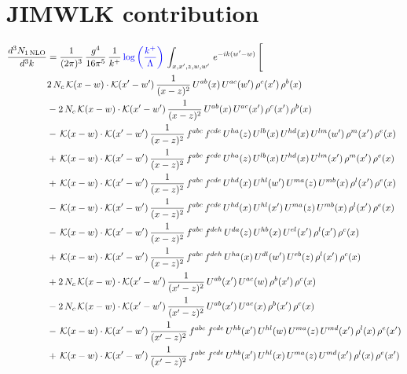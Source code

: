 \documentclass[9pt]{article}
\numberwithin{equation}{section}
\begin{document}
\section{JIMWLK contribution}
\begin{align}
\frac{d^{3}N_{1\,\mathrm{NLO}}}{d^{3}k} & = \frac{1}{(2\pi)^{3}}\,\frac{g^{4}}{16\pi^{5}}\,\frac{1}{k^{+}}\,{\color{blue}\log{\left(\frac{k^{+}}{\Lambda}\right)}}\,\int_{x,x',z,w,w'}\,e^{-ik(w'-w)}\,\Bigg[\notag\\
&2\,N_{c}\,\mathcal{K}(x-w)\cdot\mathcal{K}(x'-w')\,\frac{1}{(x-z)^{2}}\,U^{ab}(x)\,U^{ac}(w')\,\rho^{c}(x')\,\rho^{b}(x)\notag\\
&-2\,N_{c}\,\mathcal{K}(x-w)\cdot\mathcal{K}(x'-w')\,\frac{1}{(x-z)^{2}}\,U^{ab}(x)\,U^{ac}(x')\,\rho^{c}(x')\,\rho^{b}(x)\notag\\
&-\,\mathcal{K}(x-w)\cdot\mathcal{K}(x'-w')\,\frac{1}{(x-z)^{2}}\,f^{abc}\,f^{cde}\,U^{ha}(z)\,U^{lb}(x)\,U^{hd}(x)\,U^{lm}(w')\,\rho^{m}(x')\,\rho^{e}(x)\notag\\
&+\,\mathcal{K}(x-w)\cdot\mathcal{K}(x'-w')\,\frac{1}{(x-z)^{2}}\,f^{abc}\,f^{cde}\,U^{ha}(z)\,U^{lb}(x)\,U^{hd}(x)\,U^{lm}(x')\,\rho^{m}(x')\,\rho^{e}(x)\notag\\
&+\,\mathcal{K}(x-w)\cdot\mathcal{K}(x'-w')\,\frac{1}{(x-z)^{2}}\,f^{abc}\,f^{cde}\,U^{hd}(x)\,U^{hl}(w')\,U^{ma}(z)\,U^{mb}(x)\,\rho^{l}(x')\,\rho^{e}(x)\notag\\
&-\,\mathcal{K}(x-w)\cdot\mathcal{K}(x'-w')\,\frac{1}{(x-z)^{2}}\,f^{abc}\,f^{cde}\,U^{hd}(x)\,U^{hl}(x')\,U^{ma}(z)\,U^{mb}(x)\,\rho^{l}(x')\,\rho^{e}(x)\notag\\
&-\,\mathcal{K}(x-w)\cdot\mathcal{K}(x'-w')\,\frac{1}{(x-z)^{2}}\,f^{abc}\,f^{deh}\,U^{da}(z)\,U^{hb}(x)\,U^{el}(x')\,\rho^{l}(x')\,\rho^{c}(x)\notag\\
&+\,\mathcal{K}(x-w)\cdot\mathcal{K}(x'-w')\,\frac{1}{(x-z)^{2}}\,f^{abc}\,f^{deh}\,U^{ha}(x)\,U^{dl}(w')\,U^{eb}(z)\,\rho^{l}(x')\,\rho^{c}(x)\notag\\
&+2\,N_{c}\,\mathcal{K}(x-w)\cdot\mathcal{K}(x'-w')\,\frac{1}{(x'-z)^{2}}\,U^{ab}(x')\,U^{ac}(w)\,\rho^{b}(x')\,\rho^{c}(x)\notag\\
&-2\,N_{c}\,\mathcal{K}(x-w)\cdot\mathcal{K}(x'-w')\,\frac{1}{(x'-z)^{2}}\,U^{ab}(x')\,U^{ac}(x)\,\rho^{b}(x')\,\rho^{c}(x)\notag\\
&-\,\mathcal{K}(x-w)\cdot\mathcal{K}(x'-w')\,\frac{1}{(x'-z)^{2}}\,f^{abc}\,f^{cde}\,U^{hb}(x')\,U^{hl}(w)\,U^{ma}(z)\,U^{md}(x')\,\rho^{l}(x)\,\rho^{e}(x')\notag\\
&+\,\mathcal{K}(x-w)\cdot\mathcal{K}(x'-w')\,\frac{1}{(x'-z)^{2}}\,f^{abc}\,f^{cde}\,U^{hb}(x')\,U^{hl}(x)\,U^{ma}(z)\,U^{md}(x')\,\rho^{l}(x)\,\rho^{e}(x')\notag\\

\end{align}
\end{document}

